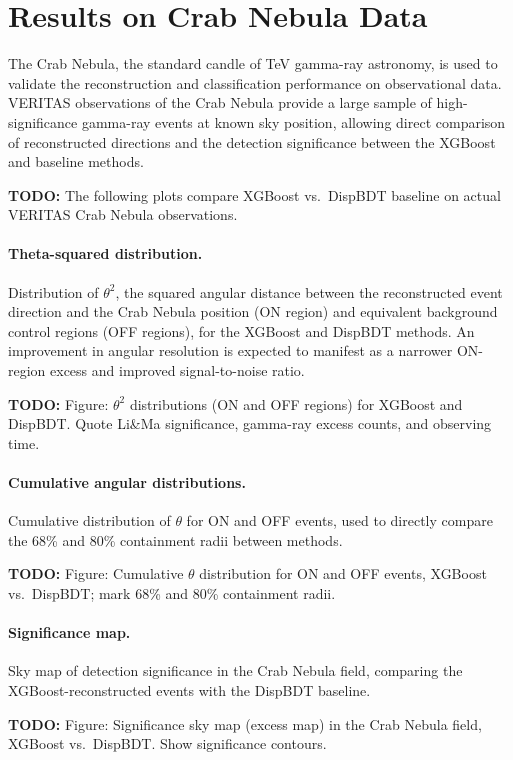 \documentclass[12pt]{article}
\newcommand{\todo}[1]{\begin{hintBox} \textbf{TODO:} #1 \end{hintBox}}
\begin{document}
\section{Results on Crab Nebula Data}
\label{sec:results}

The Crab Nebula, the standard candle of TeV gamma-ray astronomy, is used to
validate the reconstruction and classification performance on observational data.
VERITAS observations of the Crab Nebula provide a large sample of high-significance
gamma-ray events at known sky position, allowing direct comparison of reconstructed
directions and the detection significance between the XGBoost and baseline methods.

\todo{The following plots compare XGBoost vs.\ DispBDT baseline on actual VERITAS Crab Nebula observations.}

\paragraph{Theta-squared distribution.}
Distribution of $\theta^2$, the squared angular distance between the reconstructed
event direction and the Crab Nebula position (ON region) and equivalent background
control regions (OFF regions), for the XGBoost and DispBDT methods.
An improvement in angular resolution is expected to manifest as a narrower
ON-region excess and improved signal-to-noise ratio.
\todo{Figure: $\theta^2$ distributions (ON and OFF regions) for XGBoost and DispBDT. Quote Li\&Ma significance, gamma-ray excess counts, and observing time.}

\paragraph{Cumulative angular distributions.}
Cumulative distribution of $\theta$ for ON and OFF events, used to directly compare
the 68\% and 80\% containment radii between methods.
\todo{Figure: Cumulative $\theta$ distribution for ON and OFF events, XGBoost vs.\ DispBDT; mark 68\% and 80\% containment radii.}

\paragraph{Significance map.}
Sky map of detection significance in the Crab Nebula field,
comparing the XGBoost-reconstructed events with the DispBDT baseline.
\todo{Figure: Significance sky map (excess map) in the Crab Nebula field, XGBoost vs.\ DispBDT. Show significance contours.}
\end{document}
